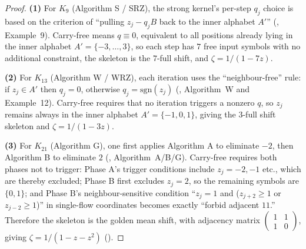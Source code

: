 \begin{proof}
\textbf{(1)} For $K_9$ (Algorithm S / SRZ), the strong kernel's per-step $q_j$ choice is based on the criterion of ``pulling $z_j-q_jB$ back to the inner alphabet $A'$'' (\cite{FrougnyHellerPelantovaSvobodovaParallelAlgorithmsSlides}, Example~9). Carry-free means $q\equiv 0$, equivalent to all positions already lying in the inner alphabet $A'=\{-3,\dots,3\}$, so each step has $7$ free input symbols with no additional constraint, the skeleton is the $7$-full shift, and $\zeta=1/(1-7z)$.

\textbf{(2)} For $K_{13}$ (Algorithm W / WRZ), each iteration uses the ``neighbour-free'' rule: if $z_j\in A'$ then $q_j=0$, otherwise $q_j=\mathrm{sgn}(z_j)$ (\cite{FrougnyHellerPelantovaSvobodovaParallelAlgorithmsSlides}, Algorithm~W and Example~12). Carry-free requires that no iteration triggers a nonzero $q$, so $z_j$ remains always in the inner alphabet $A'=\{-1,0,1\}$, giving the $3$-full shift skeleton and $\zeta=1/(1-3z)$.

\textbf{(3)} For $K_{21}$ (Algorithm G), one first applies Algorithm A to eliminate $-2$, then Algorithm B to eliminate $2$ (\cite{FrougnyHellerPelantovaSvobodovaParallelAlgorithmsSlides}, Algorithm~A/B/G). Carry-free requires both phases not to trigger: Phase A's trigger conditions include $z_j=-2,-1$ etc., which are thereby excluded; Phase B first excludes $z_j=2$, so the remaining symbols are $\{0,1\}$; and Phase B's neighbour-sensitive condition ``$z_j=1$ and ($z_{j+2}\ge 1$ or $z_{j-2}\ge 1$)'' in single-flow coordinates becomes exactly ``forbid adjacent $11$.'' Therefore the skeleton is the golden mean shift, with adjacency matrix $\begin{pmatrix}1&1\\1&0\end{pmatrix}$, giving $\zeta=1/(1-z-z^2)$ (\cite{LindMarcus1995}).
\qedhere
\end{proof}

